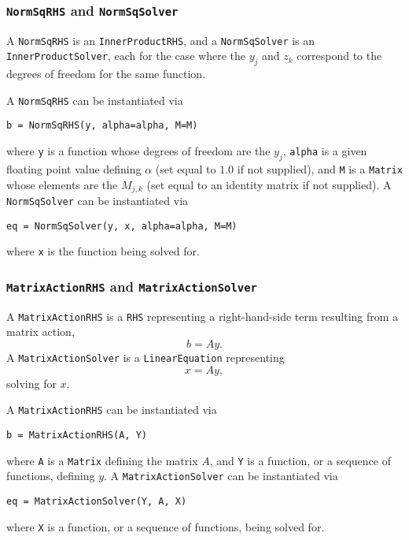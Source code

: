 \documentclass[11pt]{article}
\begin{document}
\subsubsection{\texttt{NormSqRHS} and \texttt{NormSqSolver}}

A \texttt{NormSqRHS} is an \texttt{InnerProductRHS}, and a
\texttt{NormSqSolver} is an \texttt{InnerProductSolver}, each for the case
where the $y_j$ and $z_k$ correspond to the degrees of freedom for the same
function.

A \texttt{NormSqRHS} can be instantiated via
\begin{lstlisting}
b = NormSqRHS(y, alpha=alpha, M=M)
\end{lstlisting}
where \texttt{y} is a function whose degrees of freedom are the $y_j$,
\texttt{alpha} is a given floating point value defining $\alpha$ (set equal to
$1.0$ if not supplied), and \texttt{M} is a \texttt{Matrix} whose elements are
the $M_{j,k}$ (set equal to an identity matrix if not supplied). A
\texttt{NormSqSolver} can be instantiated via
\begin{lstlisting}
eq = NormSqSolver(y, x, alpha=alpha, M=M)
\end{lstlisting}
where \texttt{x} is the function being solved for.

\subsubsection{\texttt{MatrixActionRHS} and \texttt{MatrixActionSolver}}

A \texttt{MatrixActionRHS} is a \texttt{RHS} representing a right-hand-side
term resulting from a matrix action,
\begin{equation*}
  b = A y.
\end{equation*}
A \texttt{MatrixActionSolver} is a \texttt{LinearEquation} representing
\begin{equation*}
  x = A y,
\end{equation*}
solving for $x$.

A \texttt{MatrixActionRHS} can be instantiated via
\begin{lstlisting}
b = MatrixActionRHS(A, Y)
\end{lstlisting}
where \texttt{A} is a \texttt{Matrix} defining the matrix $A$, and \texttt{Y}
is a function, or a sequence of functions, defining $y$. A
\texttt{MatrixActionSolver} can be instantiated via
\begin{lstlisting}
eq = MatrixActionSolver(Y, A, X)
\end{lstlisting}
where \texttt{X} is a function, or a sequence of functions, being solved for.
\end{document}
